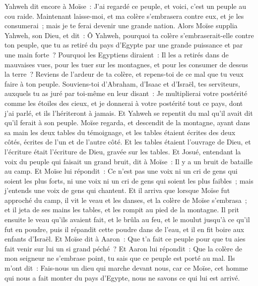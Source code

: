 \begin{multicols}{2}
Yahweh dit encore à Moïse~: J'ai regardé ce peuple, et voici, c'est un peuple au cou raide.
Maintenant laisse-moi, et ma colère s'embrasera contre eux, et je les consumerai~; mais je te ferai devenir une grande nation.
Alors Moïse supplia Yahweh, son Dieu, et dit~: Ô Yahweh, pourquoi ta colère s'embraserait-elle contre ton peuple, que tu as retiré du pays d'Egypte par une grande puissance et par une main forte~?
Pourquoi les Egyptiens diraient~: Il les a retirés dans de mauvaises vues, pour les tuer sur les montagnes, et pour les consumer de dessus la terre~? Reviens de l'ardeur de ta colère, et repens-toi de ce mal que tu veux faire à ton peuple.
Souviens-toi d'Abraham, d'Isaac et d'Israël, tes serviteurs, auxquels tu as juré par toi-même en leur disant~: Je multiplierai votre postérité comme les étoiles des cieux, et je donnerai à votre postérité tout ce pays, dont j'ai parlé, et ils l'hériteront à jamais.
Et Yahweh se repentit du mal qu'il avait dit qu'il ferait à son peuple.
Moïse regarda, et descendit de la montagne, ayant dans sa main les deux tables du témoignage, et les tables étaient écrites des deux côtés, écrites de l'un et de l'autre côté.
Et les tables étaient l'ouvrage de Dieu, et l'écriture était l'écriture de Dieu, gravée sur les tables.
Et Josué, entendant la voix du peuple qui faisait un grand bruit, dit à Moïse~: Il y a un bruit de bataille au camp.
Et Moïse lui répondit~: Ce n'est pas une voix ni un cri de gens qui soient les plus forts, ni une voix ni un cri de gens qui soient les plus faibles~; mais j'entends une voix de gens qui chantent.
Et il arriva que lorsque Moïse fut approché du camp, il vit le veau et les danses, et la colère de Moïse s'embrasa~; et il jeta de ses mains les tables, et les rompit au pied de la montagne.
Il prit ensuite le veau qu'ils avaient fait, et le brûla au feu, et le moulut jusqu'à ce qu'il fut en poudre, puis il répandit cette poudre dans de l'eau, et il en fit boire aux enfants d'Israël.
Et Moïse dit à Aaron~: Que t'a fait ce peuple pour que tu aies fait venir sur lui un si grand péché~?
Et Aaron lui répondit~: Que la colère de mon seigneur ne s'embrase point, tu sais que ce peuple est porté au mal.
Ils m'ont dit~: Fais-nous un dieu qui marche devant nous, car ce Moïse, cet homme qui nous a fait monter du pays d'Egypte, nous ne savons ce qui lui est arrivé.

\end{multicols}
